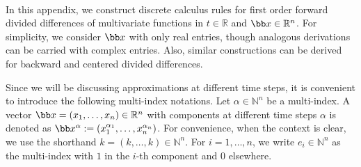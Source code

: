 \label{sec:divDiff}
$\text{ }$\\
In this appendix, we construct discrete calculus rules for first order forward divided differences of multivariate functions in $t\in \mathbb{R}$ and $\bb x\in \mathbb{R}^n$. For simplicity, we consider $\bb x$ with only real entries, though analogous derivations can be carried with complex entries. Also, similar constructions can be derived for backward and centered divided differences.

Since we will be discussing approximations at different time steps, it is convenient to introduce the following multi-index notations. Let $\alpha \in \mathbb N^{n}$ be a multi-index. A vector $\bb x=(x_1,\dots,x_n)\in \mathbb{R}^n$ with components at different time steps $\alpha$ is denoted as $\bb x^\alpha:=(x_1^{\alpha_1},\dots,x_n^{\alpha_n})$. For convenience, when the context is clear, we use the shorthand $k=(k,\dots,k) \in \mathbb{N}^n$. For $i=1,\dots, n$, we write $e_i\in \mathbb{N}^n$ as the multi-index with $1$ in the $i$-th component and $0$ elsewhere.
